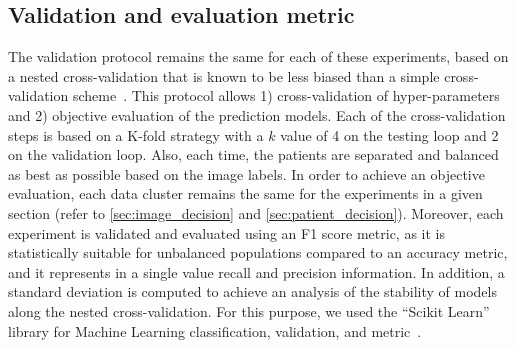 \documentclass[journal,article,accept,moreauthors,pdftex, applsci]{Definitions/mdpi}
\begin{document}
\subsection{Validation and evaluation metric}
The validation protocol remains the same for each of these experiments, based on a nested cross-validation that is known to be less biased than a simple cross-validation scheme~\cite{Cawley2010}. This protocol allows 1) cross-validation of hyper-parameters and 2) objective evaluation of the prediction models. Each of the cross-validation steps is based on a K-fold strategy with a $k$ value of 4 on the testing loop and 2 on the validation loop. Also, each time, the patients are separated and balanced as best as possible based on the image labels. In order to achieve an objective evaluation, each data cluster remains the same for the experiments in a given section (refer to \cref{sec:image_decision} and \cref{sec:patient_decision}). Moreover, each experiment is validated and evaluated using an F1 score metric, as it is statistically suitable for unbalanced populations compared to an accuracy metric, and it represents in a single value recall and precision information. In addition, a standard deviation is computed to achieve an analysis of the stability of models along the nested cross-validation. For this purpose, we used the “Scikit Learn” library for Machine Learning classification, validation, and metric~\cite{pedregosa2011scikit}.\par
\end{document}
